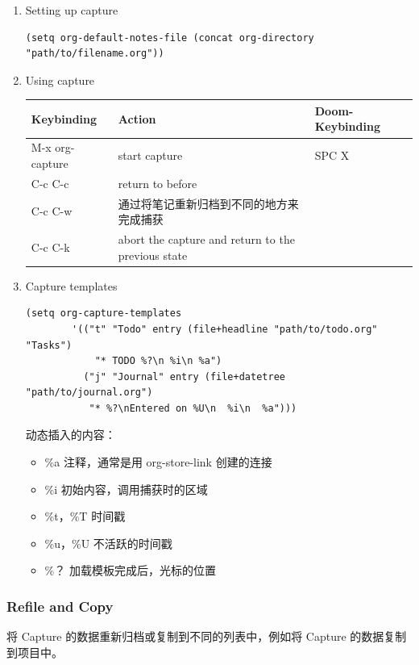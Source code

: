 \documentclass[11pt]{article}
\begin{document}
\begin{enumerate}
\item Setting up capture
\label{sec:org60827d1}
\begin{verbatim}
(setq org-default-notes-file (concat org-directory "path/to/filename.org"))
\end{verbatim}

\item Using capture
\label{sec:org64b39dd}
\begin{center}
\begin{tabular}{lll}
Keybinding & Action & Doom-Keybinding\\[0pt]
\hline
M-x org-capture & start capture & SPC X\\[0pt]
C-c C-c & return to before & \\[0pt]
C-c C-w & 通过将笔记重新归档到不同的地方来完成捕获 & \\[0pt]
C-c C-k & abort the capture and return to the previous state & \\[0pt]
\end{tabular}
\end{center}

\item Capture templates
\label{sec:orgbc28ec6}
\begin{verbatim}
(setq org-capture-templates
        '(("t" "Todo" entry (file+headline "path/to/todo.org" "Tasks")
            "* TODO %?\n %i\n %a")
          ("j" "Journal" entry (file+datetree "path/to/journal.org")
           "* %?\nEntered on %U\n  %i\n  %a")))
\end{verbatim}

动态插入的内容：
\begin{itemize}
\item \%a
注释，通常是用 org-store-link 创建的连接
\item \%i
初始内容，调用捕获时的区域
\item \%t，\%T
时间戳
\item \%u，\%U
不活跃的时间戳
\item \%？
加载模板完成后，光标的位置
\end{itemize}
\end{enumerate}


\subsubsection{Refile and Copy}
\label{sec:orgfe8eb23}

将 Capture 的数据重新归档或复制到不同的列表中，例如将 Capture 的数据复制到项目中。
\end{document}
